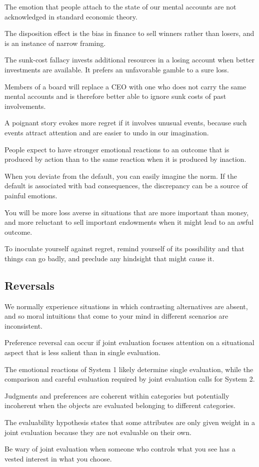 \bit
\item The emotion that people attach to the state of our mental accounts are not acknowledged in standard economic
theory.
\item The disposition effect is the bias in finance to sell winners rather than losers, and is an instance of narrow
framing.
\item The sunk-cost fallacy invests additional resources in a losing account when better investments are available.
It prefers an unfavorable gamble to a sure loss.
\item Members of a board will replace a CEO with one who does not carry the same mental accounts and is therefore
better able to ignore sunk costs of past involvements.
\item A poignant story evokes more regret if it involves unusual events, because such events attract attention and
are easier to undo in our imagination.
\item People expect to have stronger emotional reactions to an outcome that is produced by action than to the same
reaction when it is produced by inaction.
\item When you deviate from the default, you can easily imagine the norm. If the default is associated with bad
consequences, the discrepancy can be a source of painful emotions.
\item You will be more loss averse in situations that are more important than money, and more reluctant to sell
important endowments when it might lead to an awful outcome.
\item To inoculate yourself against regret, remind yourself of its possibility and that things can go badly, and
preclude any hindsight that might cause it.
\eit

\subsection*{Reversals}

\bit
\item We normally experience situations in which contrasting alternatives are absent, and so moral intuitions that
come to your mind in different scenarios are inconsistent.
\item Preference reversal can occur if joint evaluation focuses attention on a situational aspect that is less
salient than in single evaluation.
\item The emotional reactions of System 1 likely determine single evaluation, while the comparison and careful
evaluation required by joint evaluation calls for System 2.
\item Judgments and preferences are coherent within categories but potentially incoherent when the objects are
evaluated belonging to different categories.
\item The evaluability hypothesis states that some attributes are only given weight in a joint evaluation because
they are not evaluable on their own.
\item Be wary of joint evaluation when someone who controls what you see has a vested interest in what you choose.
\eit

